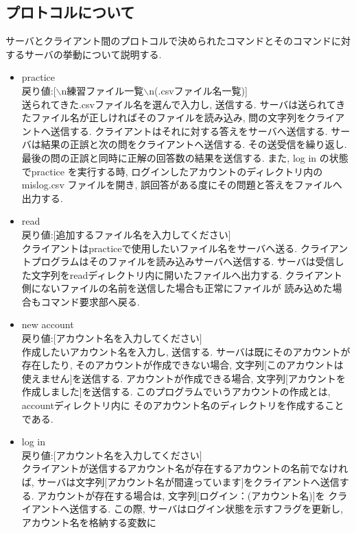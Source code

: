 \documentclass[a4j]{jarticle}
\begin{document}
\subsection{プロトコルについて}
サーバとクライアント間のプロトコルで決められたコマンドとそのコマンドに対するサーバの挙動について説明する.
\begin{itemize}
\item practice\\
  戻り値:[$\backslash$n練習ファイル一覧$\backslash$n(.csvファイル名一覧)]\\
  送られてきた.csvファイル名を選んで入力し, 送信する.
  サーバは送られてきたファイル名が正しければそのファイルを読み込み,
  問の文字列をクライアントへ送信する.
  クライアントはそれに対する答えをサーバへ送信する.
  サーバは結果の正誤と次の問をクライアントへ送信する.
  その送受信を繰り返し. 最後の問の正誤と同時に正解の回答数の結果を送信する.
  また, log in の状態でpractice を実行する時, ログインしたアカウントのディレクトリ内の
  mislog.csv ファイルを開き, 誤回答がある度にその問題と答えをファイルへ出力する.
\item read\\
  戻り値:$[$追加するファイル名を入力してください$]$\\
  クライアントはpracticeで使用したいファイル名をサーバへ送る.
  クライアントプログラムはそのファイルを読み込みサーバへ送信する.
  サーバは受信した文字列をreadディレクトリ内に開いたファイルへ出力する.
  クライアント側にないファイルの名前を送信した場合も正常にファイルが
  読み込めた場合もコマンド要求部へ戻る.
\item new account\\
  戻り値:$[$アカウント名を入力してください$]$\\
  作成したいアカウント名を入力し, 送信する.
  サーバは既にそのアカウントが存在したり, そのアカウントが作成できない場合,
  文字列$[$このアカウントは使えません$]$を送信する.
  アカウントが作成できる場合, 文字列[アカウントを作成しました]を送信する.
  このプログラムでいうアカウントの作成とは, accountディレクトリ内に
  そのアカウント名のディレクトリを作成することである.
\item log in\\
  戻り値:$[$アカウント名を入力してください$]$\\
  クライアントが送信するアカウント名が存在するアカウントの名前でなければ,
  サーバは文字列$[$アカウント名が間違っています$]$をクライアントへ送信する.
  アカウントが存在する場合は, 文字列$[$ログイン：(アカウント名)$]$を
  クライアントへ送信する.
  この際, サーバはログイン状態を示すフラグを更新し, アカウント名を格納する変数に

\end{itemize}
\end{document}
